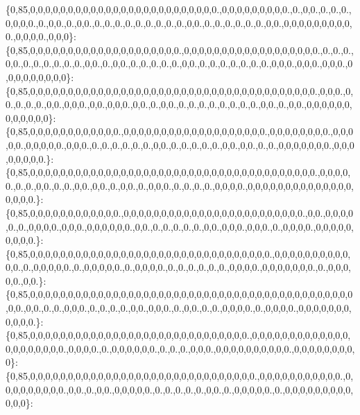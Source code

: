 \{0,85,0,0,0,0,0,0,0,0,0,0,0,0,0,0,0,0,0,0,0,0,0,0,0,0,0.,0,0,0,0,0,0,0,0,0.,0.,0,0.,0.,0.,0.,0,0,0,0.,0.,0,0.,0.,0,0.,0.,0.,0.,0.,0.,0.,0.,0.,0.,0,0.,0.,0.,0.,0.,0.,0.,0,0.,0,0,0,0,0,0,0,0,0,0.,0,0,0,0.,0,0,0\}\+: \{0,85,0,0,0,0,0,0,0,0,0,0,0,0,0,0,0,0,0,0,0,0.,0,0,0,0,0,0,0,0,0,0,0,0,0,0,0,0,0,0.,0.,0.,0.,0,0.,0.,0.,0.,0.,0.,0.,0,0.,0.,0,0.,0.,0.,0.,0.,0.,0,0.,0.,0.,0.,0.,0.,0.,0.,0,0,0.,0,0,0.,0,0,0.,0,0,0,0,0,0,0,0,0\}\+: \{0,85,0,0,0,0,0,0,0,0,0,0,0,0,0,0,0,0,0,0,0,0,0,0,0,0,0,0,0,0,0,0,0,0,0,0,0,0,0,0.,0,0,0.,0,0.,0.,0.,0.,0,0.,0,0,0.,0,0.,0,0,0.,0,0.,0.,0,0.,0.,0.,0.,0.,0.,0.,0.,0.,0,0.,0.,0,0.,0,0,0,0,0,0,0,0,0,0,0,0\}\+: \{0,85,0,0,0,0,0,0,0,0,0,0,0,0.,0,0,0,0,0,0,0,0,0,0,0,0,0,0,0,0,0,0,0.,0,0,0,0,0,0,0,0.,0,0,0,0,0.,0,0,0,0,0.,0,0,0.,0.,0.,0.,0.,0.,0.,0,0.,0.,0.,0.,0.,0.,0,0.,0,0.,0.,0.,0,0,0,0,0,0,0.,0,0,0,0,0,0,0,0.\}\+: \{0,85,0,0,0,0,0,0,0,0,0,0,0,0,0,0,0,0,0,0,0,0,0,0,0,0,0,0,0,0,0,0,0,0,0,0,0,0,0,0.,0,0,0,0,0.,0.,0.,0,0.,0.,0.,0,0.,0,0.,0.,0,0.,0.,0,0,0.,0.,0.,0.,0.,0,0,0,0.,0,0,0,0,0,0,0,0,0,0,0,0,0,0,0,0,0,0.\}\+: \{0,85,0,0,0,0,0,0,0,0,0,0,0,0.,0,0,0,0,0,0,0,0,0,0,0,0,0,0,0,0,0,0,0,0,0,0,0,0.,0,0.,0,0,0,0,0.,0.,0,0,0,0.,0,0,0.,0,0,0,0,0,0.,0,0.,0.,0.,0.,0.,0.,0,0.,0,0,0.,0,0,0.,0.,0,0,0,0.,0,0,0,0,0,0,0,0,0.\}\+: \{0,85,0,0,0,0,0,0,0,0,0,0,0,0,0,0,0,0,0,0,0,0,0,0,0,0,0,0,0,0,0,0,0,0.,0,0,0,0,0,0,0,0,0,0,0,0.,0.,0,0,0,0,0.,0.,0,0,0,0,0.,0.,0,0,0,0.,0.,0.,0.,0.,0.,0.,0,0,0,0.,0,0,0,0,0,0,0.,0.,0,0,0,0,0.,0,0.\}\+: \{0,85,0,0,0,0,0,0,0,0,0,0,0,0,0,0,0,0,0,0,0,0,0,0,0,0,0,0,0,0,0,0,0,0,0,0,0,0,0,0,0,0,0,0,0,0,0.,0,0.,0.,0.,0,0,0.,0.,0.,0.,0.,0,0.,0,0,0.,0.,0,0.,0.,0.,0,0,0,0.,0.,0,0,0,0.,0,0,0,0,0,0,0,0,0,0,0.\}\+: \{0,85,0,0,0,0,0,0,0,0,0,0,0,0,0,0,0,0,0,0,0,0,0,0,0,0,0,0,0,0,0.,0,0,0,0,0,0,0,0,0,0,0,0,0,0,0,0,0,0,0,0,0.,0,0,0,0.,0.,0,0,0,0,0,0.,0.,0.,0.,0,0,0.,0,0,0,0,0,0,0,0,0,0.,0,0,0,0,0,0,0,0,0\}\+: \{0,85,0,0,0,0,0,0,0,0,0,0,0,0,0,0,0,0,0,0,0,0,0,0,0,0,0,0,0,0,0,0.,0,0,0,0,0,0,0,0,0,0,0.,0,0,0,0,0,0,0,0,0.,0,0.,0.,0,0.,0,0,0,0,0.,0.,0.,0.,0.,0.,0,0.,0.,0,0,0,0,0.,0.,0,0,0,0,0,0,0,0,0,0,0,0\}\+: 